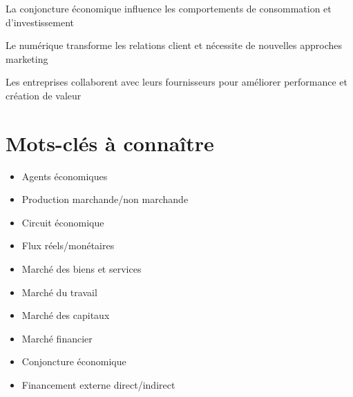 \documentclass[12pt,a4paper]{article}
\begin{document}
\begin{tcolorbox}[title=\textbf{POINT CLÉ}]
La conjoncture économique influence les comportements de consommation et d'investissement
\end{tcolorbox}

\begin{tcolorbox}[title=\textbf{POINT CLÉ}]
Le numérique transforme les relations client et nécessite de nouvelles approches marketing
\end{tcolorbox}

\begin{tcolorbox}[title=\textbf{POINT CLÉ}]
Les entreprises collaborent avec leurs fournisseurs pour améliorer performance et création de valeur
\end{tcolorbox}

\section{Mots-clés à connaître}
\begin{itemize}
    \item Agents économiques
    \item Production marchande/non marchande  
    \item Circuit économique
    \item Flux réels/monétaires
    \item Marché des biens et services
    \item Marché du travail
    \item Marché des capitaux
    \item Marché financier
    \item Conjoncture économique
    \item Financement externe direct/indirect
\end{itemize}
\end{document}
